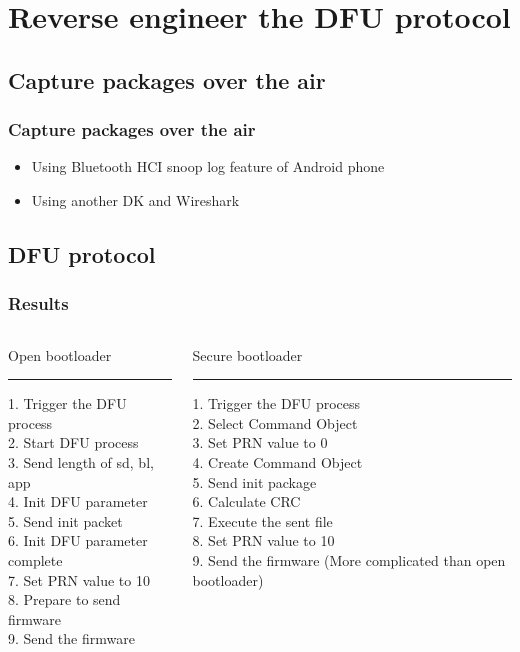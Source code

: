 \documentclass[34pt]{beamer}
\begin{document}
	
	\section{Reverse engineer the DFU protocol }
	
	\subsection{Capture packages over the air}
	\begin{frame}
		\frametitle{Capture packages over the air}
		\begin{itemize}
			\item  Using Bluetooth HCI snoop log feature of Android phone
			\vspace{2cm}
			\pause\item Using another DK and Wireshark
		\end{itemize}

	\end{frame}
	\subsection{DFU protocol}
	\begin{frame}
		\frametitle{Results}
		\begin{columns}[T] %
			\begin{column}{.48\textwidth}
				Open bootloader
				\rule{\linewidth}{4pt}
				
				1. Trigger the DFU process\\
				2. Start DFU process\\
				3. Send length of sd, bl, app\\
				4. Init DFU parameter\\
				5. Send init packet\\
				6. Init DFU parameter complete\\
				7. Set PRN value to 10\\
				8. Prepare to send firmware\\
				9. Send the firmware
			\end{column}%
			\hfill%
			\begin{column}{.48\textwidth}
				Secure bootloader
				\rule{\linewidth}{4pt}
				1. Trigger the DFU process\\
				2. Select Command Object\\
				3. Set PRN value to 0\\
				4. Create Command Object\\
				5. Send init package\\
				6. Calculate CRC\\
				7. Execute the sent file\\
				8. Set PRN value to 10\\
				9. Send the firmware
				(More complicated than open bootloader)
			\end{column}%
		\end{columns}
	\end{frame}
\end{document}
